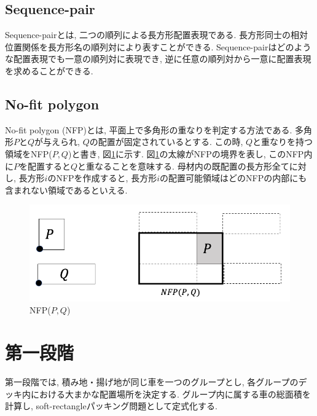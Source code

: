 \subsection{Sequence-pair}
Sequence-pairとは, 二つの順列による長方形配置表現である\cite{seq-pair}. 
長方形同士の相対位置関係を長方形名の順列対により表すことができる. 
Sequence-pairはどのような配置表現でも一意の順列対に表現でき, 逆に任意の順列対から一意に配置表現を求めることができる. 


\subsection{No-fit polygon}
No-fit polygon (NFP)とは, 平面上で多角形の重なりを判定する方法である\cite{nfp}\cite{nfp2}. 
多角形$P$と$Q$が与えられ, $Q$の配置が固定されているとする. 
この時, $Q$と重なりを持つ領域をNFP($P,Q$)と書き, 図\ref{figure31}に示す. 
図\ref{figure31}の太線がNFPの境界を表し, このNFP内に$P$を配置すると$Q$と重なることを意味する. 
母材内の既配置の長方形全てに対し, 長方形$i$のNFPを作成すると, 長方形$i$の配置可能領域はどのNFPの内部にも含まれない領域であるといえる. 

\begin{figure}[htbt]
    \label{figure31}
    \hspace{3cm}
    \includegraphics[scale = 0.3, bb=0 0 10 10]{3nfp.png}
    \caption{NFP($P,Q$)}
\end{figure}

\section{第一段階}
第一段階では, 積み地・揚げ地が同じ車を一つのグループとし, 各グループのデッキ内における大まかな配置場所を決定する. 
グループ内に属する車の総面積を計算し, soft-rectangleパッキング問題として定式化する. 

